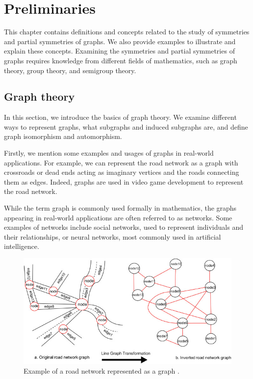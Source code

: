 \chapter{Preliminaries}\label{chap:preliminaries}

This chapter contains definitions and concepts related to the study of symmetries and partial symmetries of graphs. We also provide examples to illustrate and explain these concepts. Examining the symmetries and partial symmetries of graphs requires knowledge from different fields of mathematics, such as graph theory, group theory, and semigroup theory.

\section{Graph theory}

In this section, we introduce the basics of graph theory. We examine different ways to represent graphs, what subgraphs and induced subgraphs are, and define graph isomorphism and automorphism.

Firstly, we mention some examples and usages of graphs in real-world applications. For example, we can represent the road network as a graph with crossroads or dead ends acting as imaginary vertices and the roads connecting them as edges. Indeed, graphs are used in video game development to represent the road network.

While the term graph is commonly used formally in mathematics, the graphs appearing in real-world applications are often referred to as networks. Some examples of networks include social networks, used to represent individuals and their relationships, or neural networks, most commonly used in artificial intelligence.

\begin{figure}[H]
\includegraphics[width=\textwidth,height=\textheight,keepaspectratio]{images/road_graph.jpg}
\caption{Example of a road network represented as a graph \cite{gha21}.}
\label{fig:road_graph}
\end{figure}

